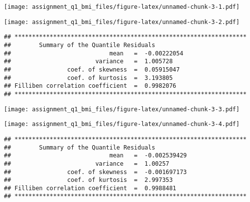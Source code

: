 \texttt{[image: assignment\_q1\_bmi\_files/figure-latex/unnamed-chunk-3-1.pdf]}

\begin{Shaded}
\begin{Highlighting}[]
\end{Highlighting}
\end{Shaded}

\texttt{[image: assignment\_q1\_bmi\_files/figure-latex/unnamed-chunk-3-2.pdf]}

\begin{verbatim}
## ******************************************************************
##        Summary of the Quantile Residuals
##                            mean   =  -0.00222054 
##                        variance   =  1.005728 
##                coef. of skewness  =  0.05915047 
##                coef. of kurtosis  =  3.193805 
## Filliben correlation coefficient  =  0.9982076 
## ******************************************************************
\end{verbatim}

\begin{Shaded}
\begin{Highlighting}[]
\OtherTok{\textless{}{-}} \NormalTok{, }\NormalTok{, }\NormalTok{(}\NormalTok{,}\NormalTok{), }\NormalTok{(}\NormalTok{,}\NormalTok{), }
\end{Highlighting}
\end{Shaded}

\texttt{[image: assignment\_q1\_bmi\_files/figure-latex/unnamed-chunk-3-3.pdf]}

\begin{Shaded}
\begin{Highlighting}[]
\end{Highlighting}
\end{Shaded}

\texttt{[image: assignment\_q1\_bmi\_files/figure-latex/unnamed-chunk-3-4.pdf]}

\begin{verbatim}
## ******************************************************************
##        Summary of the Quantile Residuals
##                            mean   =  -0.002539429 
##                        variance   =  1.00257 
##                coef. of skewness  =  -0.001697173 
##                coef. of kurtosis  =  2.997353 
## Filliben correlation coefficient  =  0.9988481 
## ******************************************************************
\end{verbatim}

